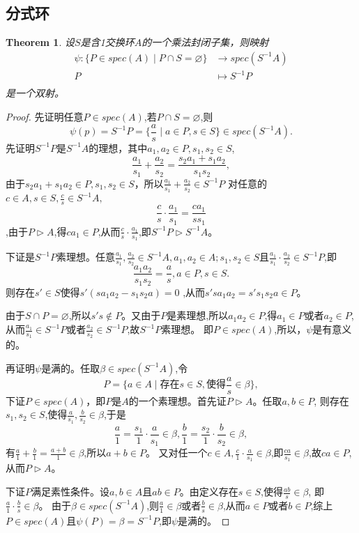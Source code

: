 \documentclass[UTF8]{article}
\newtheorem{thm}{Theorem}[section]
\begin{document}
\subsection{分式环}
\begin{thm}
	设$S$是含1交换环$A$的一个乘法封闭子集，则映射
	\[
	\begin{split}
	\psi:\{P\in spec(A)\mid P\cap S=\varnothing\}&\rightarrow spec(S^{-1}A)\\
	P&\longmapsto S^{-1}P\\
	\end{split}
	\]
	是一个双射。
\end{thm}
\begin{proof}
	先证明任意$P\in spec(A)$,若$P\cap S=\varnothing$,则
	$$\psi(p)=S^{-1}P=\{\frac{a}{s}\mid a\in P,s\in S\}\in spec(S^{-1}A).$$
	先证明$S^{-1}P$是$S^{-1}A$的理想，其中$a_1,a_2\in P,s_1,s_2\in S$,
	$$\frac{a_1}{s_1}+\frac{a_2}{s_2}=\frac{s_2a_1+s_1a_2}{s_1s_2},$$
	由于$s_2a_1+s_1a_2\in P,s_1,s_2\in S$，所以$\frac{a_1}{s_1}+\frac{a_2}{s_2}\in S^{-1}P$
	对任意的$c\in A,s\in S,\frac{c}{s}\in S^{-1}A,$
	$$\frac{c}{s}\cdot\frac{a_1}{s_1}=\frac{ca_1}{ss_1}$$
	,由于$P\triangleright A$,得$ca_1\in P$,从而$\frac{c}{s}\cdot\frac{a_1}{s_1}$,即$S^{-1}P\triangleright S^{-1}A$。
	
	
	下证是$S^{-1}P$素理想。任意$\frac{a_1}{s_1},\frac{a_2}{s_2}$$\in S^{-1}A,a_1,a_2\in A;s_1,s_2\in S$且$\frac{a_1}{s_1}\cdot\frac{a_2}{s_2}\in S^{-1}P$,即
	$$\frac{a_1a_2}{s_1s_2}=\frac{a}{s},a\in P,s\in S.$$
	则存在$s'\in S$使得$s'(sa_1a_2-s_1s_2a)=0$
	,从而$s'sa_1a_2=s's_1s_2a\in P$。
	
	由于$S\cap P=\varnothing$,所以$s's\notin P$。又由于$P$是素理想,所以$a_1a_2\in P$,得$a_1\in P$或者$a_2\in P$,从而$\frac{a_1}{s_1}\in S^{-1}P$或者$\frac{a_2}{s_2}\in S^{-1}P$,故$S^{-1}P$素理想。
	即$P\in spec(A)$,所以，$\psi$是有意义的。
	
	再证明$\psi$是满的。任取$\beta\in spec(S^{-1}A)$,令
	$$P=\{a\in A\mid\text{存在}s\in S,\text{使得}\frac{a}{s}\in\beta\},$$
	下证$P\in spec(A)$，即$P$是$A$的一个素理想。首先证$P\triangleright A$。任取$a,b\in P$,
	则存在$s_1,s_2\in S$,使得$\frac{a}{s_1},\frac{b}{s_2}\in\beta$,于是
	$$
	\frac{a}{1}=\frac{s_1}{1}\cdot\frac{a}{s_1}\in\beta,\frac{b}{1}=\frac{s_2}{1}\cdot\frac{b}{s_2}\in\beta,
	$$
	有$\frac{a}{1}+\frac{b}{1}=\frac{a+b}{1}\in\beta$,所以$a+b\in P$。
	又对任一个$c\in A,\frac{c}{1}·\frac{a}{s_1}\in\beta$,即$\frac{ca}{s_1}\in\beta$,故$ca\in P$,从而$P\triangleright A$。
	
	
	下证$P$满足素性条件。设$a,b\in A$且$ab\in P$。由定义存在$s\in S$,使得$\frac{ab}{s}\in\beta$,
	即$\frac{a}{1}·\frac{b}{s}\in\beta$。
	由于$\beta\in spec(S^{-1}A)$,则$\frac{a}{1}\in\beta$或者$\frac{b}{s}\in\beta$,从而$a\in P$或者$b\in P$,综上$P\in spec(A)$且$\psi(P)=\beta=S^{-1}P$,即$\psi$是满的。
	

\end{proof}
\end{document}
